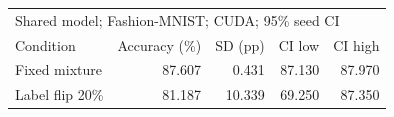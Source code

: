 \begin{tabular}{lrrrr}
\toprule
\multicolumn{5}{l}{Shared model; Fashion-MNIST; CUDA; 95\% seed CI} \\
Condition & Accuracy (\%) & SD (pp) & CI low & CI high \\
\midrule
Fixed mixture & 87.607 & 0.431 & 87.130 & 87.970 \\
Label flip 20\% & 81.187 & 10.339 & 69.250 & 87.350 \\
\bottomrule
\end{tabular}
